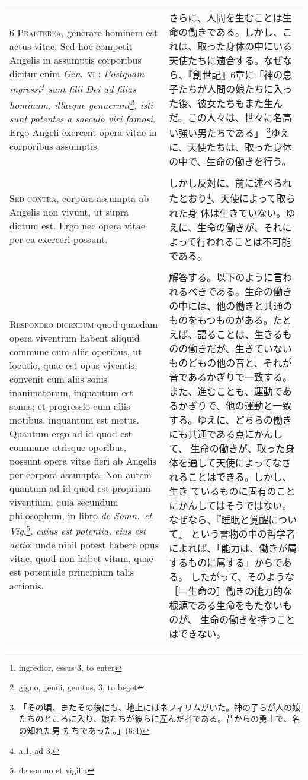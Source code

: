 \documentclass[10pt]{jsarticle} %
\begin{document}
\begin{longtable}{p{21em}p{21em}}
\\\\


{\scshape 6 Praeterea}, generare hominem est actus vitae. Sed hoc competit
Angelis in assumptis corporibus dicitur enim {\itshape Gen}.~{\scshape vi} :
{\itshape Postquam ingressi\footnote{ingredior, essus 3, to enter} sunt filii
Dei ad filias hominum, illaeque genuerunt\footnote{gigno, genui, genitus, 3, to
beget}, isti sunt potentes a saeculo viri famosi}. Ergo Angeli exercent opera
vitae in corporibus assumptis.

&

 さらに、人間を生むことは生命の働きである。しかし、これは、取った身体の中にいる
 天使たちに適合する。なぜなら、『創世記』6章に「神の息子たちが人間の娘たちに入っ
 た後、彼女たちもまた生んだ。この人々は、世々に名高い強い男たちである」
 \footnote{「その頃、またその後にも、地上にはネフィリムがいた。神の子らが人の娘
 たちのところに入り、娘たちが彼らに産んだ者である。昔からの勇士で、名の知れた男
 たちであった。」(6:4)}ゆえに、天使たちは、取った身体の中で、生命の働きを行う。


 \\\\


{\scshape Sed contra}, corpora assumpta ab Angelis non
vivunt, ut supra dictum est. Ergo nec opera vitae per ea exerceri
possunt.
&

しかし反対に、前に述べられたとおり\footnote{a.1, ad 3.}、天使によって取られた身
 体は生きていない。ゆえに、生命の働きが、それによって行われることは不可能である。
 
\\\\

{\scshape Respondeo dicendum} quod quaedam opera viventium habent aliquid
commune cum aliis operibus, ut locutio, quae est opus viventis, convenit cum
aliis sonis inanimatorum, inquantum est sonus; et progressio cum aliis motibus,
inquantum est motus. Quantum ergo ad id quod est commune utrisque operibus,
possunt opera vitae fieri ab Angelis per corpora assumpta. Non autem quantum ad
id quod est proprium viventium, quia secundum philosophum, in libro {\itshape de
Somn.~et Vig.}\footnote{de somno et vigilia}, {\itshape cuius est potentia, eius
est actio}; unde nihil potest habere opus vitae, quod non habet vitam, quae est
potentiale principium talis actionis.

&

 解答する。以下のように言われるべきである。生命の働きの中には、他の働きと共通の
 ものをもつものがある。たとえば、語ることは、生きるものの働きだが、生きていない
 ものどもの他の音と、それが音であるかぎりで一致する。また、進むことも、運動であ
 るかぎりで、他の運動と一致する。ゆえに、どちらの働きにも共通である点にかんして、
 生命の働きが、取った身体を通して天使によってなされることはできる。しかし、生き
 ているものに固有のことにかんしてはそうではない。なぜなら、『睡眠と覚醒について』
 という書物の中の哲学者によれば、「能力は、働きが属するものに属する」からである。
 したがって、そのような［＝生命の］働きの能力的な根源である生命をもたないものが、
 生命の働きを持つことはできない。



\end{longtable}
\end{document}

